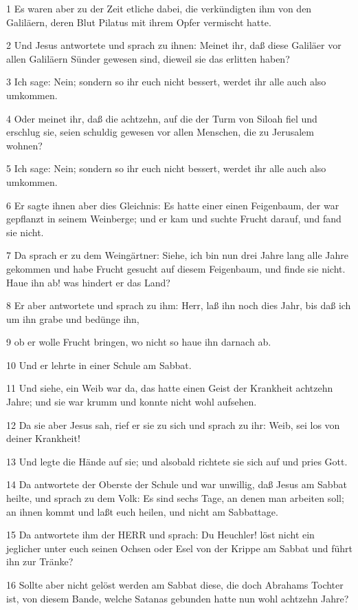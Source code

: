 \par 1 Es waren aber zu der Zeit etliche dabei, die verkündigten ihm von den Galiläern, deren Blut Pilatus mit ihrem Opfer vermischt hatte.
\par 2 Und Jesus antwortete und sprach zu ihnen: Meinet ihr, daß diese Galiläer vor allen Galiläern Sünder gewesen sind, dieweil sie das erlitten haben?
\par 3 Ich sage: Nein; sondern so ihr euch nicht bessert, werdet ihr alle auch also umkommen.
\par 4 Oder meinet ihr, daß die achtzehn, auf die der Turm von Siloah fiel und erschlug sie, seien schuldig gewesen vor allen Menschen, die zu Jerusalem wohnen?
\par 5 Ich sage: Nein; sondern so ihr euch nicht bessert, werdet ihr alle auch also umkommen.
\par 6 Er sagte ihnen aber dies Gleichnis: Es hatte einer einen Feigenbaum, der war gepflanzt in seinem Weinberge; und er kam und suchte Frucht darauf, und fand sie nicht.
\par 7 Da sprach er zu dem Weingärtner: Siehe, ich bin nun drei Jahre lang alle Jahre gekommen und habe Frucht gesucht auf diesem Feigenbaum, und finde sie nicht. Haue ihn ab! was hindert er das Land?
\par 8 Er aber antwortete und sprach zu ihm: Herr, laß ihn noch dies Jahr, bis daß ich um ihn grabe und bedünge ihn,
\par 9 ob er wolle Frucht bringen, wo nicht so haue ihn darnach ab.
\par 10 Und er lehrte in einer Schule am Sabbat.
\par 11 Und siehe, ein Weib war da, das hatte einen Geist der Krankheit achtzehn Jahre; und sie war krumm und konnte nicht wohl aufsehen.
\par 12 Da sie aber Jesus sah, rief er sie zu sich und sprach zu ihr: Weib, sei los von deiner Krankheit!
\par 13 Und legte die Hände auf sie; und alsobald richtete sie sich auf und pries Gott.
\par 14 Da antwortete der Oberste der Schule und war unwillig, daß Jesus am Sabbat heilte, und sprach zu dem Volk: Es sind sechs Tage, an denen man arbeiten soll; an ihnen kommt und laßt euch heilen, und nicht am Sabbattage.
\par 15 Da antwortete ihm der HERR und sprach: Du Heuchler! löst nicht ein jeglicher unter euch seinen Ochsen oder Esel von der Krippe am Sabbat und führt ihn zur Tränke?
\par 16 Sollte aber nicht gelöst werden am Sabbat diese, die doch Abrahams Tochter ist, von diesem Bande, welche Satanas gebunden hatte nun wohl achtzehn Jahre?
